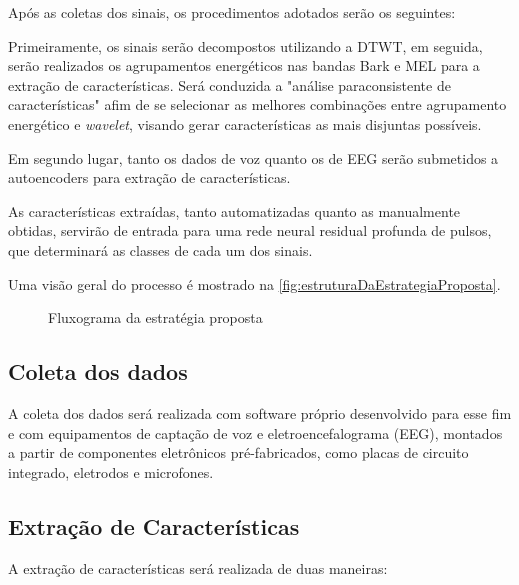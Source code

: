 		\par Após as coletas dos sinais, os procedimentos adotados serão os seguintes:
		
		\par Primeiramente, os sinais serão decompostos utilizando a DTWT, em seguida, serão realizados os agrupamentos energéticos nas bandas Bark e MEL para a extração de características. Será conduzida a "análise paraconsistente de características" afim de se selecionar as melhores combinações entre agrupamento energético e \textit{wavelet}, visando gerar características as mais disjuntas possíveis.
		
		\par Em segundo lugar, tanto os dados de voz quanto os de EEG serão submetidos a autoencoders para extração de características.
		
		\par As características extraídas, tanto automatizadas quanto as manualmente obtidas, servirão de entrada para uma rede neural residual profunda de pulsos, que determinará as classes de cada um dos sinais.
		
		\par Uma visão geral do processo é mostrado na \autoref{fig:estruturaDaEstrategiaProposta}.		
		
		\begin{figure}[h]
			\centering
			\caption[Estratégia proposta]{Fluxograma da estratégia proposta}
			\scalebox{0.75}	{
				
			}
			\label{fig:estruturaDaEstrategiaProposta}
		\end{figure}
	
		\subsection{Coleta dos dados}
			\par A coleta dos dados será realizada com software próprio desenvolvido para esse fim e com equipamentos de captação de voz e eletroencefalograma (EEG), montados a partir de componentes eletrônicos pré-fabricados, como placas de circuito integrado, eletrodos e microfones.
	
		\subsection{Extração de Características}
		
			\par A extração de características será realizada de duas maneiras:
			
